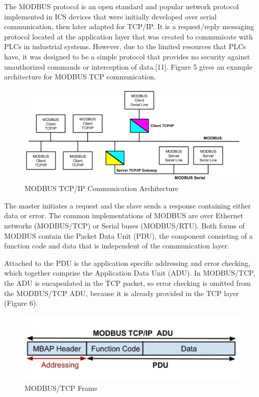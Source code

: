 \documentclass[11pt,a4paper]{article}
\begin{document}
The MODBUS protocol is an open standard and popular network protocol
implemented in ICS devices that were initially developed over serial
communication, then later adapted for TCP/IP. It is a request/reply
messaging protocol located at the application layer that was created to
communicate with PLCs in industrial systems. However, due to the limited
resources that PLCs have, it was designed to be a simple protocol that
provides no security against unauthorized commands or interception of
data.{[}11{]}. Figure 5 gives an example architecture for MODBUS TCP
communication.

\begin{figure}[h]

{\centering \includegraphics{thesis_files/figure-latex/unnamed-chunk-8-1} 

}

\caption{MODBUS TCP/IP Communication Architecture}\label{fig:unnamed-chunk-8}
\end{figure}

The master initiates a request and the slave sends a response containing
either data or error. The common implementations of MODBUS are over
Ethernet networks (MODBUS/TCP) or Serial buses (MODBUS/RTU). Both forms
of MODBUS contain the Packet Data Unit (PDU), the component consisting
of a function code and data that is independent of the communication
layer.

Attached to the PDU is the application specific addressing and error
checking, which together comprise the Application Data Unit (ADU). In
MODBUS/TCP, the ADU is encapsulated in the TCP packet, so error checking
is omitted from the MODBUS/TCP ADU, because it is already provided in
the TCP layer (Figure 6).

\begin{figure}[h]

{\centering \includegraphics{thesis_files/figure-latex/unnamed-chunk-9-1} 

}

\caption{MODBUS/TCP Frame}\label{fig:unnamed-chunk-9}
\end{figure}
\end{document}
